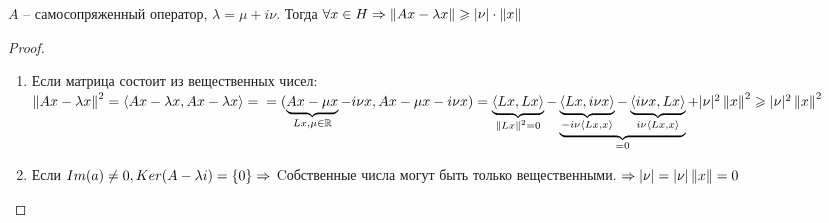 \begin{statement}
    $A$ -- самосопряженный оператор, $\lambda = \mu + i \nu$.
    Тогда $\forall x \in H \Rightarrow 
    \left\|Ax - \lambda x\right\| \geqslant |\nu| \cdot \left\|x\right\|$
\end{statement}
\begin{proof}\
    \begin{enumerate}
    	\item Если матрица состоит из вещественных чисел:
            $\left\|Ax - \lambda x\right\|^2 = \left\langle Ax - \lambda x , Ax - \lambda x\right\rangle = \\ 
            = (\underbrace{Ax - \mu x} _{Lx, \mu \in \mathbb{R}} - i \nu x,
            Ax - \mu x - i \nu x) =
            \underbrace{\left\langle Lx , Lx\right\rangle}_{\left\|Lx\right\|^2 = 0} - 
            \underbrace{
                \underbrace{\left\langle Lx , i \nu x\right\rangle} _{- i \nu \left\langle Lx , x\right\rangle} - 
                \underbrace{\left\langle i \nu x , Lx\right\rangle}_{i \nu \left\langle Lx , x\right\rangle}
            }_{= 0} + 
            |\nu|^2 \left\|x\right\|^2 \geqslant |\nu|^2 \left\|x\right\|^2$
        \item Если $Im(a) \neq 0, \\ 
            Ker(A - \lambda i) = \{0\} \Rightarrow$
            Cобственные числа могут быть только вещественными.
            $\Rightarrow |\nu| = |\nu|\left\|x\right\| = 0$
    \end{enumerate}
\end{proof}

